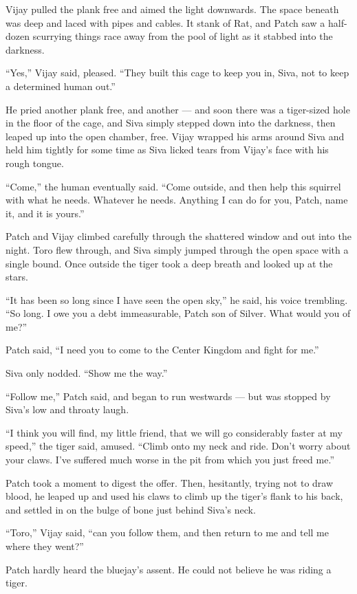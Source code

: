 \documentclass[ebook,oneside,openany,17pt]{memoir}
\begin{document}
Vijay pulled the plank free and aimed the light downwards. The space
beneath was deep and laced with pipes and cables. It stank of Rat, and
Patch saw a half-dozen scurrying things race away from the pool of
light as it stabbed into the darkness.

“Yes,” Vijay said, pleased. “They built this cage to keep you in,
Siva, not to keep a determined human out.”

He pried another plank free, and another — and soon there was a
tiger-sized hole in the floor of the cage, and Siva simply stepped
down into the darkness, then leaped up into the open chamber,
free. Vijay wrapped his arms around Siva and held him tightly for some
time as Siva licked tears from Vijay’s face with his rough tongue.

“Come,” the human eventually said. “Come outside, and then help this
squirrel with what he needs. Whatever he needs. Anything I can do for
you, Patch, name it, and it is yours.”

Patch and Vijay climbed carefully through the shattered window and out
into the night. Toro flew through, and Siva simply jumped through the
open space with a single bound. Once outside the tiger took a deep
breath and looked up at the stars.

“It has been so long since I have seen the open sky,” he said, his
voice trembling. “So long. I owe you a debt immeasurable, Patch son of
Silver. What would you of me?”

Patch said, “I need you to come to the Center Kingdom and fight for
me.”

Siva only nodded. “Show me the way.”

“Follow me,” Patch said, and began to run westwards — but was stopped
by Siva’s low and throaty laugh.

“I think you will find, my little friend, that we will go considerably
faster at my speed,” the tiger said, amused. “Climb onto my neck and
ride. Don’t worry about your claws. I’ve suffered much worse in the
pit from which you just freed me.”

Patch took a moment to digest the offer. Then, hesitantly, trying not
to draw blood, he leaped up and used his claws to climb up the tiger’s
flank to his back, and settled in on the bulge of bone just behind
Siva’s neck.

“Toro,” Vijay said, “can you follow them, and then return to me and
tell me where they went?”

Patch hardly heard the bluejay’s assent. He could not believe he was
riding a tiger.
\end{document}
